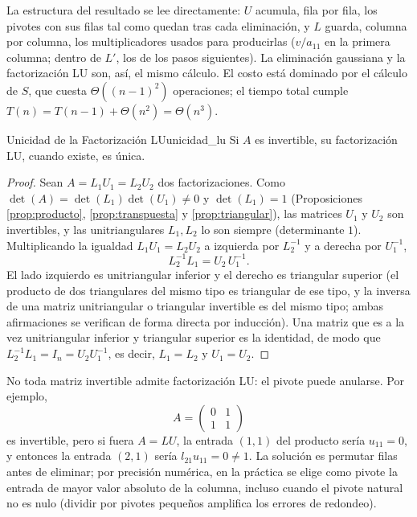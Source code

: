 \documentclass[11pt, a4paper]{article}
\begin{document}
La estructura del resultado se lee directamente: $U$ acumula, fila por fila, los pivotes con sus filas tal como quedan tras cada eliminación, y $L$ guarda, columna por columna, los multiplicadores usados para producirlas ($v / a_{11}$ en la primera columna; dentro de $L'$, los de los pasos siguientes). La eliminación gaussiana y la factorización LU son, así, el mismo cálculo. El costo está dominado por el cálculo de $S$, que cuesta $\Theta((n-1)^2)$ operaciones; el tiempo total cumple $T(n) = T(n-1) + \Theta(n^2) = \Theta(n^3)$.

\begin{teorema}{Unicidad de la Factorización LU}{unicidad_lu}
Si $A$ es invertible, su factorización LU, cuando existe, es única.
\end{teorema}

\begin{proof}
Sean $A = L_1 U_1 = L_2 U_2$ dos factorizaciones. Como $\det(A) = \det(L_1) \det(U_1) \neq 0$ y $\det(L_1) = 1$ (Proposiciones \ref{prop:producto}, \ref{prop:transpuesta} y \ref{prop:triangular}), las matrices $U_1$ y $U_2$ son invertibles, y las unitriangulares $L_1, L_2$ lo son siempre (determinante $1$). Multiplicando la igualdad $L_1 U_1 = L_2 U_2$ a izquierda por $L_2^{-1}$ y a derecha por $U_1^{-1}$,
\[
L_2^{-1} L_1 = U_2 \, U_1^{-1}.
\]
El lado izquierdo es unitriangular inferior y el derecho es triangular superior (el producto de dos triangulares del mismo tipo es triangular de ese tipo, y la inversa de una matriz unitriangular o triangular invertible es del mismo tipo; ambas afirmaciones se verifican de forma directa por inducción). Una matriz que es a la vez unitriangular inferior y triangular superior es la identidad, de modo que $L_2^{-1} L_1 = I_n = U_2 U_1^{-1}$, es decir, $L_1 = L_2$ y $U_1 = U_2$.
\end{proof}

No toda matriz invertible admite factorización LU: el pivote puede anularse. Por ejemplo,
\[
A = \begin{pmatrix} 0 & 1 \\ 1 & 1 \end{pmatrix}
\]
es invertible, pero si fuera $A = LU$, la entrada $(1,1)$ del producto sería $u_{11} = 0$, y entonces la entrada $(2,1)$ sería $l_{21} u_{11} = 0 \neq 1$. La solución es permutar filas antes de eliminar; por precisión numérica, en la práctica se elige como pivote la entrada de mayor valor absoluto de la columna, incluso cuando el pivote natural no es nulo (dividir por pivotes pequeños amplifica los errores de redondeo).
\end{document}
